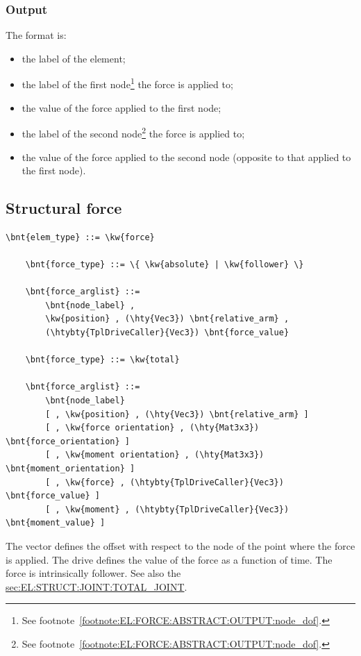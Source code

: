 \subsubsection{Output}
The format is:
\begin{itemize}
    \item the label of the element;
    \item the label of the first node\footnote{See
	footnote~\ref{footnote:EL:FORCE:ABSTRACT:OUTPUT:node_dof}.}
	the force is applied to;
    \item the value of the force applied to the first node;
    \item the label of the second node\footnote{See
	footnote~\ref{footnote:EL:FORCE:ABSTRACT:OUTPUT:node_dof}.}
	the force is applied to;
    \item the value of the force applied to the second node
	  (opposite to that applied to the first node).
\end{itemize}

\subsection{Structural force}
\label{sec:EL:FORCE:STRUCTURAL:FORCE}
\begin{Verbatim}[commandchars=\\\{\}]
    \bnt{elem_type} ::= \kw{force}

    \bnt{force_type} ::= \{ \kw{absolute} | \kw{follower} \} 

    \bnt{force_arglist} ::=
        \bnt{node_label} , 
        \kw{position} , (\hty{Vec3}) \bnt{relative_arm} ,
        (\htybty{TplDriveCaller}{Vec3}) \bnt{force_value}

    \bnt{force_type} ::= \kw{total}

    \bnt{force_arglist} ::=
        \bnt{node_label}
        [ , \kw{position} , (\hty{Vec3}) \bnt{relative_arm} ]
        [ , \kw{force orientation} , (\hty{Mat3x3}) \bnt{force_orientation} ]
        [ , \kw{moment orientation} , (\hty{Mat3x3}) \bnt{moment_orientation} ]
        [ , \kw{force} , (\htybty{TplDriveCaller}{Vec3}) \bnt{force_value} ]
        [ , \kw{moment} , (\htybty{TplDriveCaller}{Vec3}) \bnt{moment_value} ]
\end{Verbatim}
The vector  defines the offset with respect
to the node of the point where the force is applied.
The drive  defines the value of the force
as a function of time.
The  force is intrinsically follower.
See also the 
\hyperref{\kw{total joint}}{\kw{total joint} (Section~}{)}{sec:EL:STRUCT:JOINT:TOTAL_JOINT}.

